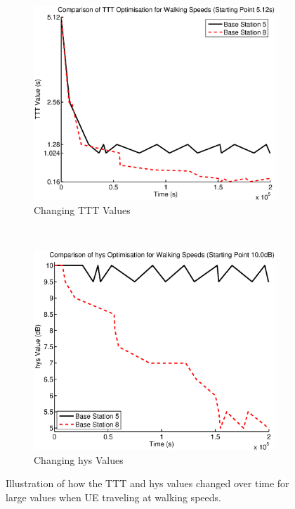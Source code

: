 \begin{figure}[H]
        \centering
        \begin{subfigure}[b]{0.49\textwidth}
                \includegraphics[width=\textwidth]{figures/walking_figures/high/long_ttt.eps}
                \caption{Changing TTT Values}
                \label{fig:walk_high_ttt}
        \end{subfigure}%
        ~ %
        \begin{subfigure}[b]{0.49\textwidth}
                \includegraphics[width=\textwidth]{figures/walking_figures/high/long_hys.eps}
                \caption{Changing hys Values}
                \label{fig:walk_high_hys}
        \end{subfigure}
        \caption{Illustration of how the TTT and hys values changed over time for large values when UE traveling at walking speeds.}\label{fig:walk_high_ttthys}
\end{figure}
